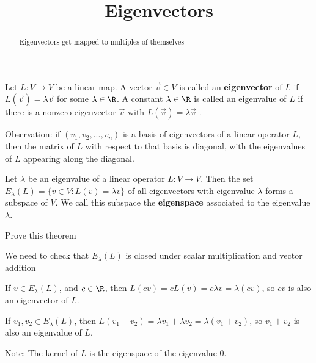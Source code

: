 \documentclass{ximera}
\title{Eigenvectors}
\begin{document}
\begin{abstract}
	Eigenvectors get mapped to multiples of themselves
\end{abstract}

\begin{definition}
	Let $L:V \to V$ be a linear map.  A vector $\vec{v} \in V$ is called an \textbf{eigenvector} of $L$ if $L(\vec{v})  =\lambda \vec{v}$ for some $\lambda \in \R$. 
	 A constant $\lambda \in \R$ is called an eigenvalue of $L$ if there is a nonzero eigenvector  $\vec{v}$ with $L(\vec{v}) = \lambda \vec{v}$ .
\end{definition}

Observation:  if $(v_1,v_2,...,v_n)$ is a basis of eigenvectors of a linear operator $L$, then the matrix of $L$ with respect to that basis is diagonal, with the eigenvalues
of $L$ appearing along the diagonal.

\begin{theorem}
	Let $\lambda$ be an eigenvalue of a linear operator $L:V\to V$.  Then the set $E_\lambda(L) = \{ v \in V: L(v) = \lambda v\}$ of all eigenvectors with eigenvalue $\lambda$ forms a subspace of $V$.
	We call this subspace the \textbf{eigenspace} associated to the eigenvalue $\lambda$.
\end{theorem}

Prove this theorem
\begin{free-response}
	We need to check that $E_\lambda(L)$ is closed under scalar multiplication and vector addition
	
	If $v \in E_\lambda(L)$, and $c \in \R$, then $L(cv) = cL(v) = c\lambda v = \lambda( cv)$, so $cv$ is also an eigenvector of $L$.
	
	If $v_1,v_2 \in E_\lambda(L)$, then $L(v_1+v_2) = \lambda v_1+\lambda v_2 = \lambda( v_1 + v_2)$, so $v_1+v_2$ is also an eigenvalue of $L$.
\end{free-response}

Note: The kernel of $L$ is the eigenspace of the eigenvalue $0$.
\end{document}
